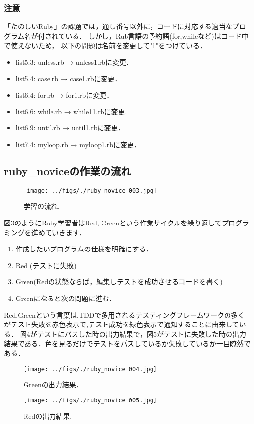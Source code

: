 \subsubsection{注意}
「たのしいRuby」の課題では，通し番号以外に，コードに対応する適当なプログラム名が付されている．
しかし，Rub言語の予約語(for,whileなど)はコード中で使えないため，
以下の問題は名前を変更して"1"をつけている．

\begin{itemize}
\item list5.3:  unless.rb → unless1.rbに変更．
\item list5.4:  case.rb → case1.rbに変更．
\item list6.4:  for.rb → for1.rbに変更．
\item list6.6:  while.rb → while11.rbに変更.
\item list6.9:  until.rb → until1.rbに変更．
\item list7.4:  myloop.rb → myloop1.rbに変更．
\end{itemize}
\subsection{ruby\_noviceの作業の流れ}
\begin{figure}[htbp]\begin{center}
\texttt{[image: ../figs/./ruby\_novice.003.jpg]}
\caption{学習の流れ.}
\label{default}\end{center}\end{figure}
図3のようにRuby学習者はRed, Greenという作業サイクルを繰り返してプログラミングを進めていきます．

\begin{enumerate}
\item 作成したいプログラムの仕様を明確にする．
\item Red (テストに失敗)
\item Green(Redの状態ならば，編集しテストを成功させるコードを書く)
\item Greenになると次の問題に進む．
\end{enumerate}
Red,Greenという言葉は,TDDで多用されるテスティングフレームワークの多くがテスト失敗を赤色表示で,テスト成功を緑色表示で通知することに由来している．
図4がテストにパスした時の出力結果で，図5がテストに失敗した時の出力結果である．色を見るだけでテストをパスしているか失敗しているか一目瞭然である．

\begin{figure}[htbp]\begin{center}
\texttt{[image: ../figs/./ruby\_novice.004.jpg]}
\caption{Greenの出力結果．}
\label{default}\end{center}\end{figure}
\begin{figure}[htbp]\begin{center}
\texttt{[image: ../figs/./ruby\_novice.005.jpg]}
\caption{Redの出力結果.}
\label{default}\end{center}\end{figure}
